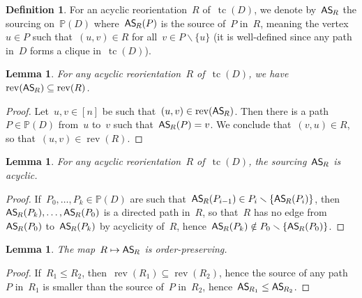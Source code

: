 \documentclass{amsart}
\newtheorem{lemma}[theorem]{Lemma}
\theoremstyle{definition}
\newtheorem{definition}[theorem]{Definition}
\newtheorem{remark}[theorem]{Remark}
\newcommand{\ssm}{\smallsetminus} %
\DeclareMathOperator{\tc}{tc} %
\newcommand{\mymap}[2]{\mathsf{#1}_{\hspace{-.7pt}#2}}
\newcommand{\reori}[1]{\mymap{R}{#1}}  %
\DeclareMathOperator{\rev}{rev} %
\newcommand{\asour}[1]{\mymap{AS}{#1}}  %
\newcommand{\PP}{\mathbb P} %
\begin{document}
\begin{definition}
\label{def:AReori2ASour}
For an acyclic reorientation~$R$ of~$\tc(D)$, we denote by~$\asour{R}$ the sourcing on~$\PP(D)$ where~$\asour{R}(P)$ is the source of~$P$ in~$R$, meaning the vertex~$u \in P$ such that~$(u,v) \in R$ for all~$v \in P \ssm \{u\}$ (it is well-defined since any path in~$D$ forms a clique in~$\tc(D)$).
\end{definition}

\begin{lemma}
\label{lem:AReori2ASour1}
For any acyclic reorientation~$R$ of~$\tc(D)$, we have~$\rev(\asour{R}) \subseteq \rev(R)$.
\end{lemma}

\begin{proof}
Let~$u,v \in [n]$ be such that~$(u,v) \in \rev(\asour{R})$. 
Then there is a path~$P \in \PP(D)$ from~$u$ to~$v$ such that~$\asour{R}(P) = v$.
We conclude that~$(v,u) \in R$, so that~$(u,v) \in \rev(R)$.
\end{proof}

\begin{lemma}
\label{lem:AReori2ASour2}
For any acyclic reorientation~$R$ of~$\tc(D)$, the sourcing~$\asour{R}$ is acyclic.
\end{lemma}

\begin{proof}
If~$P_0, \dots, P_k \in \PP(D)$ are such that~$\asour{R}(P_{i-1}) \in P_i \ssm \{\asour{R}(P_i)\}$, then~$\asour{R}(P_k), \dots, \asour{R}(P_0)$ is a directed path in~$R$, so that~$R$ has no edge from~$\asour{R}(P_0)$ to~$\asour{R}(P_k)$ by acyclicity of~$R$, hence~${\asour{R}(P_k) \notin P_0 \ssm \{\asour{R}(P_0)\}}$.
\end{proof}

\begin{lemma}
\label{lem:AReori2ASour3}
The map~$R \mapsto \asour{R}$ is order-preserving.
\end{lemma}

\begin{proof}
If~$R_1 \le R_2$, then~$\rev(R_1) \subseteq \rev(R_2)$, hence the source of any path~$P$ in~$R_1$ is smaller than the source of~$P$ in~$R_2$, hence~$\asour{R_1} \le \asour{R_2}$.
\end{proof}

\end{document}
